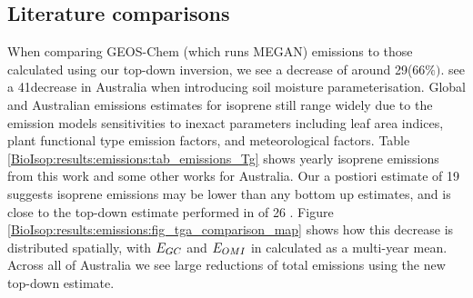       
      
  \subsection{Literature comparisons}
    
    When comparing GEOS-Chem (which runs MEGAN) emissions to those calculated using our top-down inversion, we see a decrease of around 29\tgpyr ($66\%)$.
    \textcite{Sindelarova2014} see a 41\tgpyr decrease in Australia when introducing soil moisture parameterisation.
    Global and Australian emissions estimates for isoprene still range widely due to the emission models sensitivities to inexact parameters including leaf area indices, plant functional type emission factors, and meteorological factors.
    Table \ref{BioIsop:results:emissions:tab_emissions_Tg} shows yearly isoprene emissions from this work and some other works for Australia.
    Our a postiori estimate of 19 \tgpyr suggests isoprene emissions may be lower than any bottom up estimates, and is close to the top-down estimate performed in \textcite{Bauwens2016} of 26 \tgpyr.
    Figure \ref{BioIsop:results:emissions:fig_tga_comparison_map} shows how this decrease is distributed spatially, with $E_{GC}$ and $E_{OMI}$ in \tgpyr calculated as a multi-year mean.
    Across all of Australia we see large reductions of total emissions using the new top-down estimate.
    
